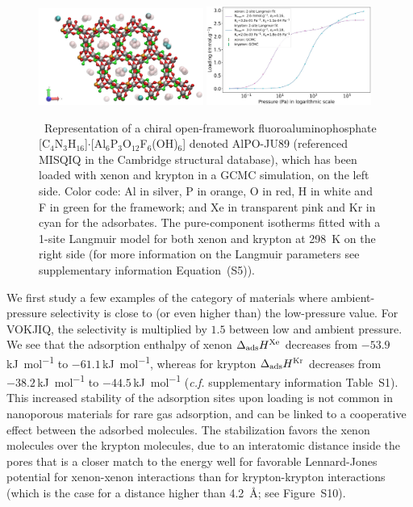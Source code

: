 \documentclass[main.tex]{subfiles}
\begin{document}
  \begin{figure}[t]
  \centering
    \includegraphics[width=0.48\textwidth]{figures/2-thermo/MISQIQ_clean.jpg}\hfill
    \includegraphics[width=0.48\textwidth]{figures/2-thermo/MISQIQ_clean_isotherm_xenon_krypton_298K.jpg}
    \caption{\ Representation of a chiral open-framework fluoroaluminophosphate [C$_4$N$_3$H$_{16}$]$\cdot$[Al$_6$P$_3$O$_{12}$F$_6$(OH)$_6$] denoted AlPO-JU89 (referenced MISQIQ in the Cambridge structural database), which has been loaded with xenon and krypton in a GCMC simulation, on the left side.\cite{MISQIQ} Color code: Al in silver, P in orange, O in red, H in white and F in green for the framework; and Xe in transparent pink and Kr in cyan for the adsorbates. The pure-component isotherms fitted with a 1-site Langmuir model for both xenon and krypton at \SI{298}{\kelvin} on the right side (for more information on the Langmuir parameters see supplementary information Equation~(S5)).}
    \label{fgr:MISQIQ}
  \end{figure}
  
  We first study a few examples of the category of materials where ambient-pressure selectivity is close to (or even higher than) the low-pressure value. For VOKJIQ, the selectivity is multiplied by $1.5$ between low and ambient pressure. We see that the adsorption enthalpy of xenon $\Delta_{\text{ads}}H^{\text{Xe}}$ decreases from $-53.9$\,\si{\kilo\joule\per\mol} to $-61.1$\,\si{\kilo\joule\per\mol}, whereas for krypton $\Delta_{\text{ads}}H^{\text{Kr}}$ decreases from $-38.2$\,\si{\kilo\joule\per\mol} to $-44.5$\,\si{\kilo\joule\per\mol} (\emph{c.f.} supplementary information Table~S1). This increased stability of the adsorption sites upon loading is not common in nanoporous materials for rare gas adsorption, and can be linked to a cooperative effect between the adsorbed molecules. The stabilization favors the xenon molecules over the krypton molecules, due to an interatomic distance inside the pores that is a closer match to the energy well for favorable Lennard-Jones potential for xenon-xenon interactions than for krypton-krypton interactions (which is the case for a distance higher than \SI{4.2}{\angstrom}; see Figure~S10).
  
\end{document}
